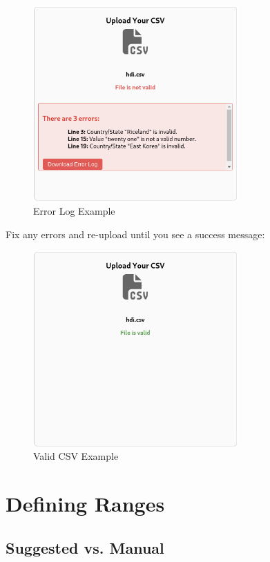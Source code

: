 \documentclass{article}
\begin{document}
\begin{figure}[h!]
  \centering
  \includegraphics[width=0.7\textwidth]{error.png}
  \caption{Error Log Example}
\end{figure}

Fix any errors and re-upload until you see a success message:

\begin{figure}[h!]
  \centering
  \includegraphics[width=0.7\textwidth]{valid.png}
  \caption{Valid CSV Example}
\end{figure}


\section{Defining Ranges}

\subsection{Suggested vs. Manual}
\end{document}
